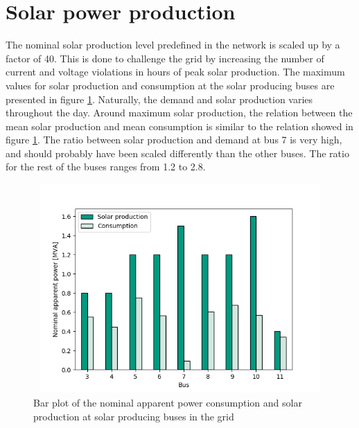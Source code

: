 \documentclass[class=book, crop=false, 11pt]{standalone}
\begin{document}
\section{Solar power production}
The nominal solar production level predefined in the network is scaled up by a factor of 40. This is done to challenge the grid by increasing the number of current and voltage violations in hours of peak solar production. The maximum values for solar production and consumption at the solar producing buses are presented in figure \ref{fig:discussion:nominal_sgen}. Naturally, the demand and solar production varies throughout the day. Around maximum solar production, the relation between the mean solar production and mean consumption is similar to the relation showed in figure \ref{fig:discussion:nominal_sgen}. The ratio between solar production and demand at bus 7 is very high, and should probably have been scaled differently than the other buses. The ratio for the rest of the buses ranges from 1.2 to 2.8. 

\begin{figure}[h]
    \center
\includegraphics[height=8cm, width=12cm]{figures/nominal_sgen.png}
    \caption {Bar plot of the nominal apparent power consumption and solar production at solar producing buses in the grid}
    \label{fig:discussion:nominal_sgen}
\end{figure}
\end{document}
